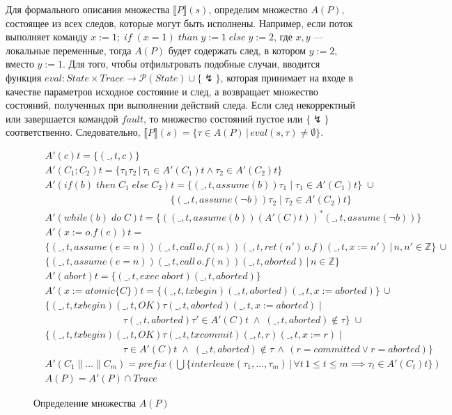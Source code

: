 Для формального описания множества $\llbracket P \rrbracket (s)$, определим множество $A(P)$, состоящее из всех следов, которые могут быть исполнены. Например, если поток выполняет команду $x := 1;\; if \; (x = 1) \; than \; y := 1 \; else \; y := 2$, где $x, y$ --- локальные переменные, тогда $A(P)$ будет содержать след, в котором $y := 2$, вместо $y := 1$. Для того, чтобы отфильтровать подобные случаи, вводится функция $eval: State \times Trace \to \mathcal{P}(State) \cup \{\lightning\}$, которая принимает на входе в качестве параметров исходное состояние и след, а возвращает множество состояний, полученных при выполнении действий следа. Если след некорректный или завершается командой $fault$, то множество состояний пустое или $\{\lightning\}$ соответственно. Следовательно, $\llbracket P \rrbracket (s) = \{\tau \in A(P) \, | \, eval(s,\tau) \neq \emptyset \}$.
\begin{figure}[t]
\small
\begin{align*}
&A'(c)t = \{(\_, t, c)\} \\ 
&A'(C_1;C_2)t = \{\tau_1\tau_2 \,| \, \tau_1 \in A'(C_1)t \land \tau_2 \in A'(C_2)t \} \\
&A'(if \left (b \right) \; then \; C_1 \; else \; C_2)t = \{(\_, t, assume(b))\tau_1 \; | \; \tau_1 \in A'(C_1)t \} \; \cup \\
& \qquad \qquad \qquad \qquad \qquad \qquad \; \; \; \{ (\_, t, assume(\neg b))\tau_2 \; | \; \tau_2 \in A'(C_2)t\} \\
&A'(while \left (b \right) \; do \; C)t = \{ ((\_,t,assume(b))(A'(C)t))^*(\_,t,assume(\neg b)) \} \\
&A'(x := o.f(e))t = \\
&\{ (\_,t, assume(e =n))(\_, t, call \, o.f(n))(\_,t,ret(n') \, o.f)(\_,t,x:=n') \, | \, n, n' \in \mathbb{Z}\} \, \cup \\
&\{(\_,t,assume(e=n))(\_,t,call \, o.f(n))(\_,t,aborted) \, | \, n \in \mathbb{Z} \} \\
&A'(abort)t = \{ (\_, t, exec \; abort)(\_, t, aborted)\} \\
&A'(x:=atomic\{C\})t = \{ (\_,t,txbegin)(\_,t,aborted)(\_,t,x:= aborted) \} \, \cup  \\
&\{(\_,t,txbegin)(\_,t,OK)\tau(\_,t,aborted)(\_,t,x:= aborted) \; | \\
& \qquad \qquad \qquad \qquad \tau(\_,t,aborted)\tau' \in A'(C)t \; \land \; (\_,t,aborted) \notin \tau\} \; \cup \\ 
&\{(\_,t,txbegin)(\_,t,OK)\tau(\_,t,txcommit)(\_,t,r)(\_,t,x:= r) \; |\\ 
&\qquad \qquad \qquad \qquad \tau \in A'(C)t  \; \land \; (\_,t,aborted) \notin \tau \, \land \, (r = committed \lor r = aborted) \} \\
&A'(C_1 \parallel \ldots \parallel C_m) = prefix(\bigcup \{ interleave(\tau_1,\ldots, \tau_m) \, | \, \forall t \, 1 \leq t \leq m \implies \tau_t \in A'(C_t)t \}) \\
& A(P) = A'(P) \cap Trace
\end{align*}
 \caption{Определение множества $A(P)$}
\label{fig:actions}
\end{figure}

